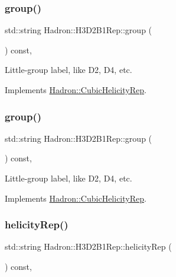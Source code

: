 \subsubsection{\texorpdfstring{group()}{group()}\hspace{0.1cm}{\footnotesize\ttfamily [2/3]}}
{\footnotesize\ttfamily std\+::string Hadron\+::\+H3\+D2\+B1\+Rep\+::group (\begin{DoxyParamCaption}{ }\end{DoxyParamCaption}) const\hspace{0.3cm}{\ttfamily [inline]}, {\ttfamily [virtual]}}

Little-\/group label, like D2, D4, etc. 

Implements \mbox{\hyperlink{structHadron_1_1CubicHelicityRep_a101a7d76cd8ccdad0f272db44b766113}{Hadron\+::\+Cubic\+Helicity\+Rep}}.

\mbox{\label{structHadron_1_1H3D2B1Rep_a6fa498fcad9f73335cba8e82709d663d}} 
\subsubsection{\texorpdfstring{group()}{group()}\hspace{0.1cm}{\footnotesize\ttfamily [3/3]}}
{\footnotesize\ttfamily std\+::string Hadron\+::\+H3\+D2\+B1\+Rep\+::group (\begin{DoxyParamCaption}{ }\end{DoxyParamCaption}) const\hspace{0.3cm}{\ttfamily [inline]}, {\ttfamily [virtual]}}

Little-\/group label, like D2, D4, etc. 

Implements \mbox{\hyperlink{structHadron_1_1CubicHelicityRep_a101a7d76cd8ccdad0f272db44b766113}{Hadron\+::\+Cubic\+Helicity\+Rep}}.

\mbox{\label{structHadron_1_1H3D2B1Rep_a3264ff0e5357cfb2c346fa2c8f68cab5}} 
\subsubsection{\texorpdfstring{helicityRep()}{helicityRep()}\hspace{0.1cm}{\footnotesize\ttfamily [1/2]}}
{\footnotesize\ttfamily std\+::string Hadron\+::\+H3\+D2\+B1\+Rep\+::helicity\+Rep (\begin{DoxyParamCaption}{ }\end{DoxyParamCaption}) const\hspace{0.3cm}{\ttfamily [inline]}, {\ttfamily [virtual]}}

